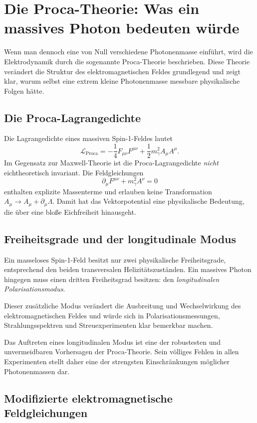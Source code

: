 \section{Die Proca-Theorie: Was ein massives Photon bedeuten würde}

Wenn man dennoch eine von Null verschiedene Photonenmasse einführt, wird die 
Elektrodynamik durch die sogenannte Proca-Theorie beschrieben. Diese Theorie 
verändert die Struktur des elektromagnetischen Feldes grundlegend und zeigt 
klar, warum selbst eine extrem kleine Photonenmasse messbare physikalische 
Folgen hätte.

\subsection*{Die Proca-Lagrangedichte}

Die Lagrangedichte eines massiven Spin-1-Feldes lautet
\[
\mathcal{L}_{\mathrm{Proca}}
= -\frac{1}{4}F_{\mu\nu}F^{\mu\nu}
+ \frac{1}{2}m_\gamma^2 A_\mu A^\mu .
\]
Im Gegensatz zur Maxwell-Theorie ist die Proca-Lagrange­dichte \emph{nicht} 
eichtheoretisch invariant. Die Feldgleichungen
\[
\partial_\mu F^{\mu\nu} + m_\gamma^2 A^\nu = 0
\]
enthalten explizite Massenterme und erlauben keine Transformation 
$A_\mu \rightarrow A_\mu + \partial_\mu \Lambda$. Damit hat das 
Vektorpotential eine physikalische Bedeutung, die über eine bloße 
Eichfreiheit hinausgeht.

\subsection*{Freiheitsgrade und der longitudinale Modus}

Ein masseloses Spin-1-Feld besitzt nur zwei physikalische Freiheitsgrade, 
entsprechend den beiden transversalen Helizitätszuständen.  
Ein massives Photon hingegen muss einen dritten Freiheitsgrad besitzen:  
den \emph{longitudinalen Polarisationsmodus}.  

Dieser zusätzliche Modus verändert die Ausbreitung und Wechselwirkung des 
elektromagnetischen Feldes und würde sich in Polarisationsmessungen, 
Strahlungsspektren und Streuexperimenten klar bemerkbar machen.

Das Auftreten eines longitudinalen Modus ist eine der robustesten und 
unvermeidbaren Vorhersagen der Proca-Theorie. Sein völliges Fehlen in allen 
Experimenten stellt daher eine der strengsten Einschränkungen möglicher 
Photonenmassen dar.

\subsection*{Modifizierte elektromagnetische Feldgleichungen}

